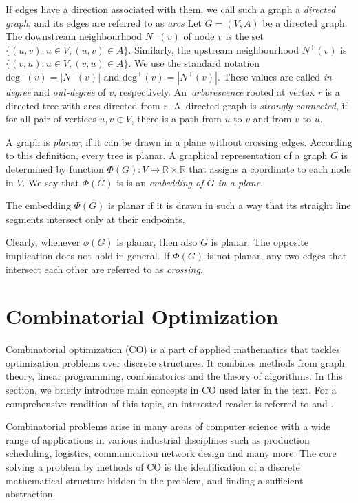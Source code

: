 If edges have a direction associated with them, we call such a graph a \emph{directed graph}, and its edges are referred to as \emph{arcs}
Let $G=(V,A)$ be a directed graph. 
The downstream neighbourhood $N^-(v)$ of node $v$ is the set $\{(u,v): u\in V, (u,v) \in A\}$. 
Similarly, the upstream neighbourhood $N^+(v)$ is $\{(v,u): u\in V, (v,u) \in A\}$.
We use the standard notation $\text{deg}^-(v)=|N^-(v)|$ and $\text{deg}^+(v)=|N^+(v)|$.
These values are called \emph{in-degree} and \emph{out-degree} of $v$, respectively.
An~\emph{arborescence} rooted at vertex $r$ is a directed tree with arcs directed from $r$.
A~directed graph is \emph{strongly connected}, if for all pair of vertices $u,v\in V$, there is a path from $u$ to $v$ and from $v$ to $u$.

A graph is \emph{planar}, if it can be drawn in a plane without crossing edges.
According to this definition, every tree is planar. 
A graphical representation of a graph $G$ is determined by function $\Phi(G):V\mapsto\mathbb{R}\times\mathbb{R}$ that assigns a coordinate to each node in $V$. 
We say that $\Phi(G)$ is is an \emph{embedding of $G$ in a plane}.
\begin{definition}\label{def:planemb}
The embedding $\Phi(G)$ is planar if it is drawn in such a way that its straight line segments intersect only at their endpoints.
\end{definition}
Clearly, whenever $\phi(G)$ is planar, then also $G$ is planar. 
The opposite implication does not hold in general. 
If $\Phi(G)$ is not planar, any two edges that intersect each other are referred to as \emph{crossing}.

\section{Combinatorial Optimization}

Combinatorial optimization (CO) is a part of applied mathematics that tackles optimization problems over discrete structures.
It combines methods from graph theory, linear programming, combinatorics and the theory of algorithms.
In this section, we briefly introduce main concepts in CO used later in the text.
For a comprehensive rendition of this topic, an interested reader is referred to \cite{wolsey98} and \cite{nemhauser88}.

Combinatorial problems arise in many areas of computer science with a wide range of applications in various industrial disciplines 
such as production scheduling, logistics, communication network design and many more.
The core solving a problem by methods of CO is the identification of a discrete mathematical structure hidden in the problem,
and finding a sufficient abstraction.


